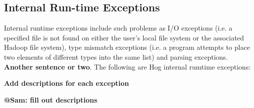 \documentclass{article}
\begin{document}

\subsection{Internal Run-time Exceptions} %
\label{sub:internal_run_time_exceptions}

Internal run­time exceptions include such problems as I/O exceptions (i.e. a
specified file is not found on either the user’s local file system or the
associated Hadoop file system), type mismatch exceptions (i.e. a program attempts
to place two elements of different types into the same list) and parsing
exceptions. \textbf{Another sentence or two}. The following are Hog internal
rum­time exceptions:

\textbf{Add descriptions for each exception}

\textbf{@Sam: fill out descriptions}
\end{document}
